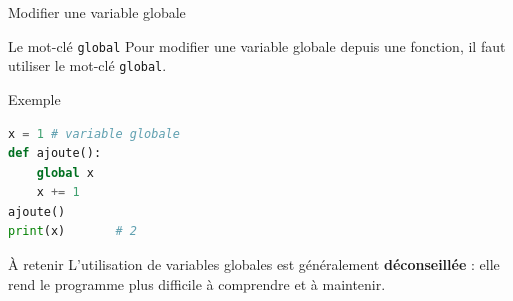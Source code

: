 \documentclass[10pt, xcolor={svgnames}]{beamer}
\begin{document}
\begin{frame}[fragile]{Modifier une variable globale}
	
	\begin{block}{Le mot-clé \texttt{global}}
		Pour modifier une variable globale depuis une fonction,
		il faut utiliser le mot-clé \texttt{global}.
	\end{block}
	
	\vspace{0.3cm}
	
	\begin{exampleblock}{Exemple}
		\begin{lstlisting}[language=Python]
x = 1 # variable globale
def ajoute():
	global x
	x += 1
ajoute()
print(x)       # 2
		\end{lstlisting}
	\end{exampleblock}
	
	\vspace{0.2cm}
	
	\begin{alertblock}{À retenir}
		L'utilisation de variables globales est généralement
		\textbf{déconseillée} : elle rend le programme plus difficile à comprendre
		et à maintenir.
	\end{alertblock}
	
\end{frame}
\end{document}
